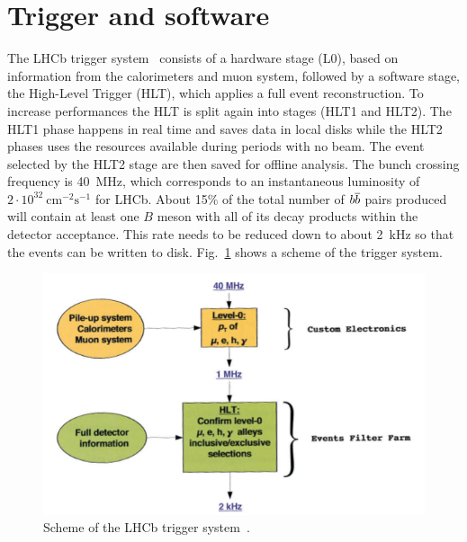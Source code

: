 \section{Trigger and software}

The LHCb trigger system~\cite{LHCb-DP-2012-004} consists of a hardware stage (L0), based on information from the calorimeters
and muon system, followed by a software stage, the High-Level Trigger (HLT), which applies a full event reconstruction.
To increase performances the HLT is split again into stages (HLT1 and HLT2). The HLT1 phase happens in real time and saves
data in local disks while the HLT2 phases uses the resources available during periods with no beam. The event selected by
the HLT2 stage are then saved for offline analysis. The bunch crossing frequency is 40~$\mbox{MHz}$, which corresponds to
an instantaneous luminosity of $2 \cdot 10^{32} ~\mbox{cm}^{-2} \mbox{s}^{-1}$ for LHCb. About 15\% of the total number of
$b\overline {b}$ pairs produced will contain at least one $B$ meson with all of its decay products within the detector acceptance. This rate needs to be
reduced down to about 2~kHz so that the events can be written to disk. Fig.~\ref{triggerscheme}
shows a scheme of the trigger system.

\begin{figure}[h!]
\centering 
\includegraphics[width=0.9\linewidth]{Detector/figs/triggerscheme.png}
\caption{Scheme of the LHCb trigger system~\cite{Alves:2008zz}.}
\label{triggerscheme}
\end{figure}

